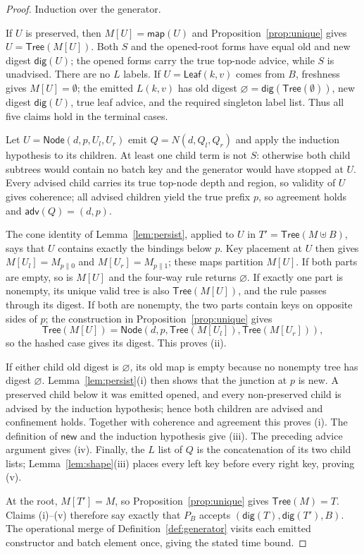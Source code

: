 \documentclass[twocolumn]{article}
\begin{document}
\begin{proof}
Induction over the generator.

If $U$ is preserved, then $M[U]=\mathsf{map}(U)$ and Proposition~\ref{prop:unique} gives $U=\mathsf{Tree}(M[U])$. Both $S$ and the opened-root forms have equal old and new digest $\mathsf{dig}(U)$; the opened forms carry the true top-node advice, while $S$ is unadvised. There are no $L$ labels. If $U=\mathsf{Leaf}(k,v)$ comes from $B$, freshness gives $M[U]=\emptyset$; the emitted $L(k,v)$ has old digest $\varnothing=\mathsf{dig}(\mathsf{Tree}(\emptyset))$, new digest $\mathsf{dig}(U)$, true leaf advice, and the required singleton label list. Thus all five claims hold in the terminal cases.

Let $U=\mathsf{Node}(d,p,U_l,U_r)$ emit $Q=N(d,Q_l,Q_r)$ and apply the induction hypothesis to its children. At least one child term is not $S$: otherwise both child subtrees would contain no batch key and the generator would have stopped at $U$. Every advised child carries its true top-node depth and region, so validity of $U$ gives coherence; all advised children yield the true prefix $p$, so agreement holds and $\mathsf{adv}(Q)=(d,p)$.

The cone identity of Lemma~\ref{lem:persist}, applied to $U$ in $T'=\mathsf{Tree}(M\uplus B)$, says that $U$ contains exactly the bindings below $p$. Key placement at $U$ then gives $M[U_l]=M_{p\|0}$ and $M[U_r]=M_{p\|1}$; these maps partition $M[U]$. If both parts are empty, so is $M[U]$ and the four-way rule returns $\varnothing$. If exactly one part is nonempty, its unique valid tree is also $\mathsf{Tree}(M[U])$, and the rule passes through its digest. If both are nonempty, the two parts contain keys on opposite sides of $p$; the construction in Proposition~\ref{prop:unique} gives
\[
  \mathsf{Tree}(M[U])
  = \mathsf{Node}(d,p,\mathsf{Tree}(M[U_l]),\mathsf{Tree}(M[U_r])),
\]
so the hashed case gives its digest. This proves (ii).

If either child old digest is $\varnothing$, its old map is empty because no nonempty tree has digest $\varnothing$. Lemma~\ref{lem:persist}(i) then shows that the junction at $p$ is new. A preserved child below it was emitted opened, and every non-preserved child is advised by the induction hypothesis; hence both children are advised and confinement holds. Together with coherence and agreement this proves (i). The definition of $\mathsf{new}$ and the induction hypothesis give (iii). The preceding advice argument gives (iv). Finally, the $L$ list of $Q$ is the concatenation of its two child lists; Lemma~\ref{lem:shape}(iii) places every left key before every right key, proving (v).

At the root, $M[T']=M$, so Proposition~\ref{prop:unique} gives $\mathsf{Tree}(M)=T$. Claims (i)--(v) therefore say exactly that $P_B$ accepts $(\mathsf{dig}(T),\mathsf{dig}(T'),B)$. The operational merge of Definition~\ref{def:generator} visits each emitted constructor and batch element once, giving the stated time bound.
\end{proof}
\end{document}

